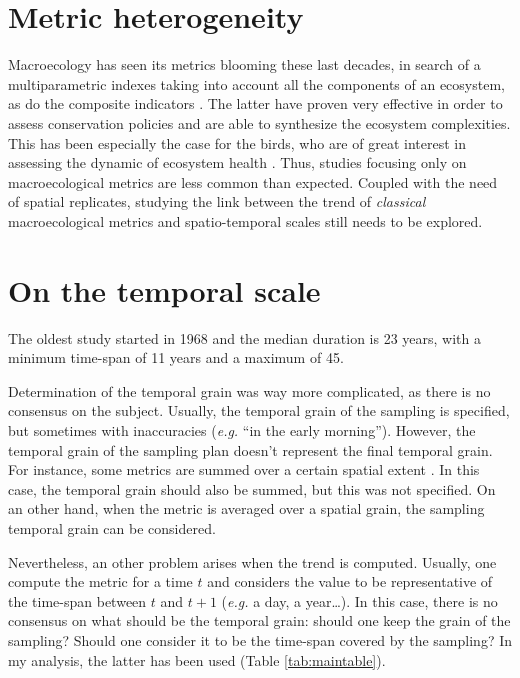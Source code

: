 \documentclass[
  12pt,
  oneside]{report}
\begin{document}
\hypertarget{metric-heterogeneity}{%
\section{Metric heterogeneity}\label{metric-heterogeneity}}

Macroecology has seen its metrics blooming these last decades, in search of a multiparametric indexes taking into account all the components of an ecosystem, as do the composite indicators \autocites[\emph{e.g.} the red list index,][]{butchart_improvements_2007}[biodiversity change indexes,][]{normander_indicator_2012}. The latter have proven very effective in order to assess conservation policies and are able to synthesize the ecosystem complexities. This has been especially the case for the birds, who are of great interest in assessing the dynamic of ecosystem health \autocite{fraixedas_state_2020}. Thus, studies focusing only on macroecological metrics are less common than expected. Coupled with the need of spatial replicates, studying the link between the trend of \emph{classical} macroecological metrics and spatio-temporal scales still needs to be explored.

\hypertarget{on-the-temporal-scale}{%
\section{On the temporal scale}\label{on-the-temporal-scale}}

The oldest study started in 1968 and the median duration is 23 years, with a minimum time-span of 11 years and a maximum of 45.

Determination of the temporal grain was way more complicated, as there is no consensus on the subject. Usually, the temporal grain of the sampling is specified, but sometimes with inaccuracies (\emph{e.g.} ``in the early morning''). However, the temporal grain of the sampling plan doesn't represent the final temporal grain. For instance, some metrics are summed over a certain spatial extent \autocite[e.g.~summing the species richness over an atlas square, like in][]{van_turnhout_scale-dependent_2007}. In this case, the temporal grain should also be summed, but this was not specified. On an other hand, when the metric is averaged over a spatial grain, the sampling temporal grain can be considered.

Nevertheless, an other problem arises when the trend is computed. Usually, one compute the metric for a time \(t\) and considers the value to be representative of the time-span between \(t\) and \(t+1\) (\emph{e.g.} a day, a year\ldots). In this case, there is no consensus on what should be the temporal grain: should one keep the grain of the sampling? Should one consider it to be the time-span covered by the sampling? In my analysis, the latter has been used (Table \ref{tab:maintable}).
\end{document}
